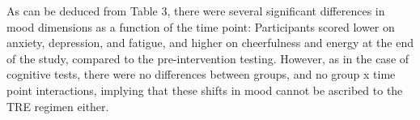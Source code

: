 \documentclass[authordate, empirical]{jote-new-article}
\begin{document}
As can be deduced from Table 3, there were several significant differences in mood dimensions as a function of the time point: Participants scored lower on anxiety, depression, and fatigue, and higher on cheerfulness and energy at the end of the study, compared to the pre-intervention testing. However, as in the case of cognitive tests, there were no differences between groups, and no group x time point interactions, implying that these shifts in mood cannot be ascribed to the TRE regimen either.








\begin{table}[th!]
  \begin{fullwidth}
    \caption{Scores on mood and sleep quality questionnaires across time points for experimental and control group, and the results of mixed model repeated measures ANOVAs, with group (experimental vs. control) as a source of variance between participants and time point (1\textsuperscript{st}/2\textsuperscript{nd}/3\textsuperscript{rd}) as a within-group source of variance.
    }
\end{fullwidth}
\end{table}
\end{document}
